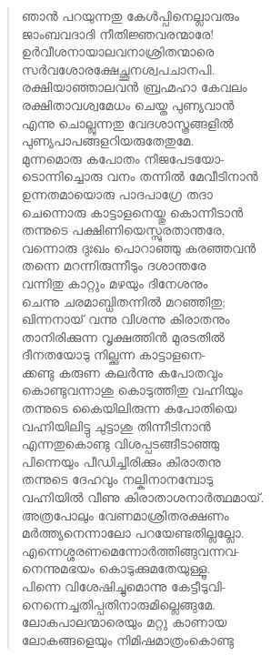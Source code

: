 \begin{verse}
ഞാന്‍ പറയുന്നതു കേള്‍പ്പിനെല്ലാവരും\\
ജാംബവദാദി നീതിജ്ഞവരന്മാരേ!\\
ഉര്‍വീശനായാലവനാശ്രിതന്മാരെ\\
സര്‍വശോരക്ഷേച്ഛുനശ്വപചാനപി.\\
രക്ഷിയാഞ്ഞാലവന്‍ ബ്രഹ്മഹാ കേവലം\\
രക്ഷിതാവശ്വമേധം ചെയ്ത പുണ്യവാന്‍\\
എന്നു ചൊല്ലുന്നതു വേദശാസ്ത്രങ്ങളില്‍\\
പുണ്യപാപങ്ങളറിയരുതേതുമേ.\\
മുന്നമൊരു കപോതം നിജപേടയോ-\\
ടൊന്നിച്ചൊരു വനം തന്നില്‍ മേവീടിനാന്‍\\
ഉന്നതമായൊരു പാദപാഗ്രേ തദാ\\
ചെന്നൊരു കാട്ടാളനെയ്തു കൊന്നീടാന്‍\\
തന്നുടെ പക്ഷിണിയെസ്സുരതാന്തരേ,\\
വന്നൊരു ദുഃഖം പൊറാഞ്ഞു കരഞ്ഞവന്‍\\
തന്നെ മറന്നിരുന്നീടും ദശാന്തരേ\\
വന്നിതു കാറ്റും മഴയും ദിനേശനും\\
ചെന്നു ചരമാബ്ധിതന്നില്‍ മറഞ്ഞിതു;\\
ഖിന്നനായ് വന്നു വിശന്നു കിരാതനും\\
താനിരിക്കുന്ന വൃക്ഷത്തിന്‍ മുരടതില്‍\\
ദീനതയോടു നില്ക്കുന്ന കാട്ടാളനെ-\\
ക്കണ്ടു കരുണ കലര്‍ന്നു കപോതവും\\
കൊണ്ടുവന്നാശു കൊടുത്തിതു വഹ്നിയും\\
തന്നുടെ കൈയിലിരുന്ന കപോതിയെ\\
വഹ്നിയിലിട്ടു ചുട്ടാശു തിന്നീടിനാന്‍\\
എന്നതുകൊണ്ടു വിശപ്പടങ്ങീടാഞ്ഞു\\
പിന്നെയും പീഡിച്ചിരിക്കും കിരാതനു\\
തന്നുടെ ദേഹവും നല്കിനാനമ്പോടു\\
വഹ്നിയില്‍ വീണു കിരാതാശനാര്‍ത്ഥമായ്.\\
അത്രപോലും വേണമാശ്രിതരക്ഷണം\\
മര്‍ത്ത്യനെന്നാലോ പറയേണ്ടതില്ലല്ലോ.\\
എന്നെശ്ശരണമെന്നോര്‍ത്തിങ്ങുവന്നവ-\\
നെന്നുമഭയം കൊടുക്കുമതേയുള്ളൂ.\\
പിന്നെ വിശേഷിച്ചുമൊന്നു കേട്ടീടുവി-\\
നെന്നെച്ചതിപ്പതിനാരുമില്ലെങ്ങുമേ.\\
ലോകപാലന്മാരെയും മറ്റു കാണായ\\
ലോകങ്ങളെയും നിമിഷമാത്രംകൊണ്ടു\\

\end{verse}
